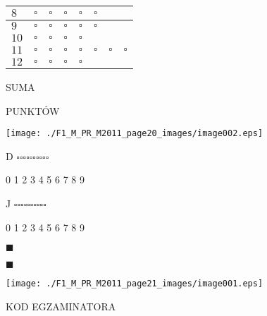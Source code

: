 \documentclass[a4paper,12pt]{article}
\begin{document}
\begin{center}
\begin{tabular}{|l|l|l|l|l|l|l|l|}
\hline
\multicolumn{1}{|l|}{ $8$}&	\multicolumn{1}{|l|}{ $\square $}&	\multicolumn{1}{|l|}{ $\square $}&	\multicolumn{1}{|l|}{ $\square $}&	\multicolumn{1}{|l|}{ $\square $}&	\multicolumn{1}{|l|}{ $\square $}&	\multicolumn{1}{|l|}{}&	\multicolumn{1}{|l|}{}	\\
\hline
\multicolumn{1}{|l|}{ $9$}&	\multicolumn{1}{|l|}{ $\square $}&	\multicolumn{1}{|l|}{ $\square $}&	\multicolumn{1}{|l|}{ $\square $}&	\multicolumn{1}{|l|}{ $\square $}&	\multicolumn{1}{|l|}{ $\square $}&	\multicolumn{1}{|l|}{}&	\multicolumn{1}{|l|}{}	\\
\hline
\multicolumn{1}{|l|}{ $10$}&	\multicolumn{1}{|l|}{ $\square $}&	\multicolumn{1}{|l|}{ $\square $}&	\multicolumn{1}{|l|}{ $\square $}&	\multicolumn{1}{|l|}{ $\square $}&	\multicolumn{1}{|l|}{}&	\multicolumn{1}{|l|}{}&	\multicolumn{1}{|l|}{}	\\
\hline
\multicolumn{1}{|l|}{ $11$}&	\multicolumn{1}{|l|}{ $\square $}&	\multicolumn{1}{|l|}{ $\square $}&	\multicolumn{1}{|l|}{ $\square $}&	\multicolumn{1}{|l|}{ $\square $}&	\multicolumn{1}{|l|}{ $\square $}&	\multicolumn{1}{|l|}{ $\square $}&	\multicolumn{1}{|l|}{ $\square $}	\\
\hline
\multicolumn{1}{|l|}{ $12$}&	\multicolumn{1}{|l|}{ $\square $}&	\multicolumn{1}{|l|}{ $\square $}&	\multicolumn{1}{|l|}{ $\square $}&	\multicolumn{1}{|l|}{ $\square $}&	\multicolumn{1}{|l|}{}&	\multicolumn{1}{|l|}{}&	\multicolumn{1}{|l|}{}	\\
\hline
\end{tabular}

\end{center}
SUMA

PUNKTÓW
\begin{center}
\texttt{[image: ./F1\_M\_PR\_M2011\_page20\_images/image002.eps]}
\end{center}
D $\square  \square  \square  \square  \square  \square  \square  \square  \square  \square $

0 1 2 3 4 5 6 7 8 9

J $\square  \square  \square  \square  \square  \square  \square  \square  \square  \square $

0 1 2 3 4 5 6 7 8 9

$\blacksquare$

$\blacksquare$




\begin{center}
\texttt{[image: ./F1\_M\_PR\_M2011\_page21\_images/image001.eps]}
\end{center}
KOD EGZAMINATORA
\end{document}
